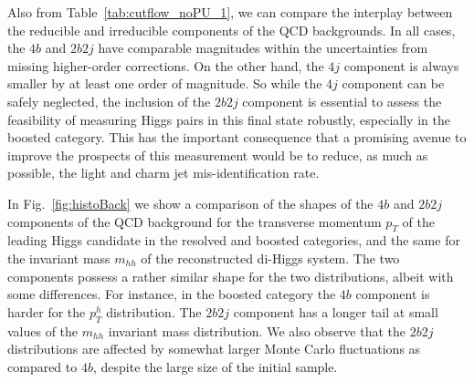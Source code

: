  Also from Table~\ref{tab:cutflow_noPU_1}, we
 can compare the interplay
 between the reducible and irreducible components of the
 QCD backgrounds.
 In all cases, the $4b$ and $2b2j$ have comparable
 magnitudes within the uncertainties from missing higher-order
 corrections.
 On the other hand, the $4j$ component
is always smaller by at least
 one order of magnitude.
  So while the $4j$ component can be safely
 neglected, the inclusion of the
 $2b2j$ component is essential to assess the feasibility
 of measuring Higgs pairs in this final state robustly,
 especially
 in the boosted category.
 This has the important
 consequence that a promising avenue to improve the prospects
 of this measurement would be to reduce, as much as possible,
 the light and charm jet mis-identification rate.

 In Fig.~\ref{fig:histoBack} we show a
 comparison
    of the shapes of the $4b$ and $2b2j$
    components of the QCD background for the transverse momentum
    $p_T$ of the leading
Higgs candidate in the resolved
and boosted  categories, and the same
 for the invariant
mass $m_{hh}$ of the
    reconstructed di-Higgs system.
    The two components possess a rather similar shape
    for the two distributions, albeit with some 
    differences.
    For instance, in the boosted
    category the $4b$ component is harder for the
    $p_T^h$ distribution.
    The $2b2j$ component has a longer
    tail at small values of the $m_{hh}$ invariant
    mass distribution.
%
    We also observe that the $2b2j$ distributions
    are affected by somewhat larger
    Monte Carlo fluctuations as compared to $4b$, despite the large size
of the initial sample.
%

